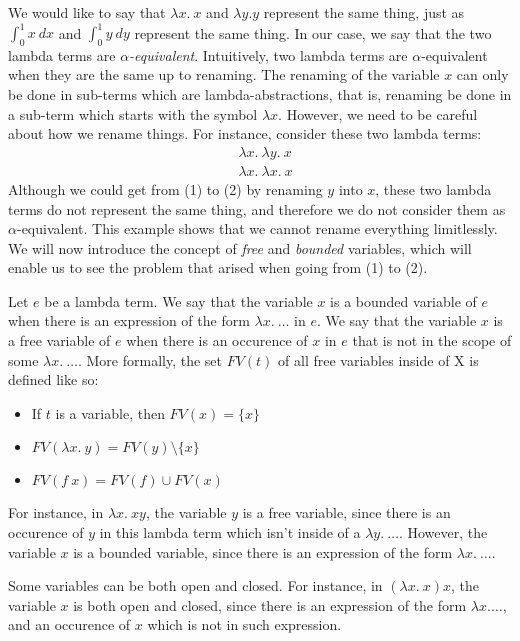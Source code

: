 We would like to say that $\lambda x.\ x$ and $\lambda y. y$ represent the same thing, just as $\int_0^1 x\ dx$ and $\int_0^1 y\ dy$ represent the same thing. In our case, we say that the two lambda terms are \textit{$\alpha$-equivalent}. Intuitively, two lambda terms are $\alpha$-equivalent when they are the same up to renaming. The renaming of the variable $x$ can only be done in sub-terms which are lambda-abstractions, that is, renaming be done in a sub-term which starts with the symbol $\lambda x$. However, we need to be careful about how we rename things. For instance, consider these two lambda terms:
\begin{align}
    &\lambda x.\ \lambda y.\ x\\
    &\lambda x.\ \lambda x.\ x
\end{align}
Although we could get from (1) to (2) by renaming $y$ into $x$, these two lambda terms do not represent the same thing, and therefore we do not consider them as $\alpha$-equivalent. This example shows that we cannot rename everything limitlessly. We will now introduce the concept of \textit{free} and \textit{bounded} variables, which will enable us to see the problem that arised when going from (1) to (2).

\begin{definition}
    Let $e$ be a lambda term. We say that the variable $x$ is a bounded variable of $e$ when there is an expression of the form $\lambda x.\ \dots$ in $e$. We say that the variable $x$ is a free variable of $e$ when there is an occurence of $x$ in $e$ that is not in the scope of some $\lambda x.\ \dots$. More formally, the set $FV(t)$ of all free variables inside of X is defined like so:
    \begin{itemize}
        \item If $t$ is a variable, then $FV(x) = \{x\}$
        \item $FV(\lambda x.\ y) = FV(y) \setminus \{x\}$
        \item $FV(f\ x) = FV(f) \cup FV(x)$
    \end{itemize}
\end{definition}

For instance, in $\lambda x.\ x y$, the variable $y$ is a free variable, since there is an occurence of $y$ in this lambda term which isn't inside of a $\lambda y.\ \dots$. However, the variable $x$ is a bounded variable, since there is an expression of the form $\lambda x.\ \dots$.

\begin{remark}
    Some variables can be both open and closed. For instance, in $(\lambda x.\ x) x$, the variable $x$ is both open and closed, since there is an expression of the form $\lambda x. \dots$, and an occurence of $x$ which is not in such expression.    
\end{remark}

